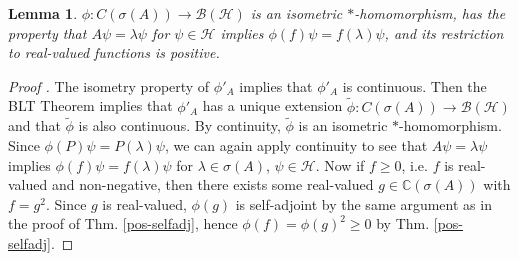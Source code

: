 \documentclass[12pt,oneside]{report}
\newtheorem{lem}[thm]{Lemma}
\begin{document}
\begin{lem}
    $\phi: C(\sigma(A)) \to \mathscr{B}(\mathscr{H})$ is an isometric $*$-homomorphism, has the property that $A\psi = \lambda \psi$ for $\psi \in \mathscr{H}$ implies $\phi(f)\psi = f(\lambda)\psi$, and its restriction to real-valued functions is positive.
\end{lem}
\begin{proof}[Proof \cite{Reed_Simon_1980}]
    The isometry property of $\phi'_{A}$ implies that $\phi'_{A}$ is continuous. Then the BLT Theorem implies that $\phi'_{A}$ has a unique extension $\tilde{\phi}: C(\sigma(A)) \to \mathscr{B}(\mathscr{H})$ and that $\tilde{\phi}$ is also continuous. By continuity, $\tilde{\phi}$ is an isometric $*$-homomorphism. Since $\phi(P)\psi = P(\lambda)\psi$, we can again apply continuity to see that $A\psi = \lambda \psi$ implies $\phi(f)\psi = f(\lambda)\psi$ for $\lambda \in \sigma(A)$, $\psi \in \mathscr{H}$. Now if $f \geq 0$, i.e. $f$ is real-valued and non-negative, then there exists some real-valued $g \in \mathbb{C}(\sigma(A))$ with $f = g^{2}$. Since $g$ is real-valued, $\phi(g)$ is self-adjoint by the same argument as in the proof of Thm. \ref{pos-selfadj}, hence $\phi(f) = \phi(g)^{2} \geq 0$ by Thm. \ref{pos-selfadj}.
\end{proof}

\end{document}
